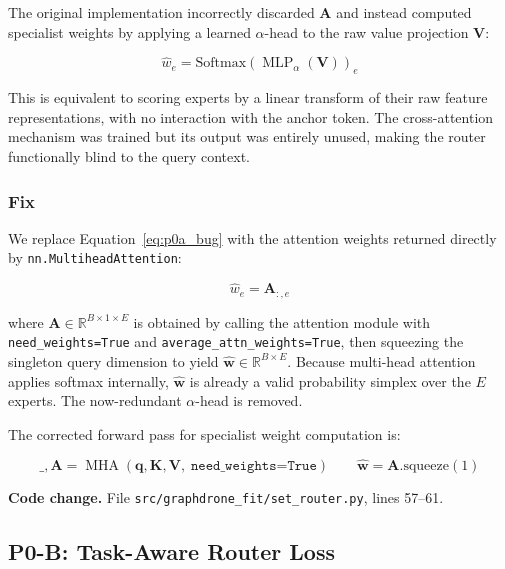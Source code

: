 The original implementation incorrectly discarded $\mathbf{A}$ and
instead computed specialist weights by applying a learned
$\alpha$-head to the raw value projection $\mathbf{V}$:

\begin{equation}
    \hat{w}_e = \text{Softmax}\!\left(
        \operatorname{MLP}_\alpha\!\left(\mathbf{V}\right)
    \right)_e
    \label{eq:p0a_bug}
\end{equation}

This is equivalent to scoring experts by a linear transform of their
raw feature representations, with no interaction with the anchor token.
The cross-attention mechanism was trained but its output was entirely
unused, making the router functionally blind to the query context.

\subsubsection{Fix}

We replace Equation~\ref{eq:p0a_bug} with the attention weights
returned directly by \texttt{nn.MultiheadAttention}:

\begin{equation}
    \hat{w}_e = \mathbf{A}_{:, e}
    \label{eq:p0a_fix}
\end{equation}

where $\mathbf{A} \in \mathbb{R}^{B \times 1 \times E}$ is obtained by
calling the attention module with \texttt{need\_weights=True} and
\texttt{average\_attn\_weights=True}, then squeezing the singleton
query dimension to yield $\hat{\mathbf{w}} \in \mathbb{R}^{B \times E}$.
Because multi-head attention applies softmax internally,
$\hat{\mathbf{w}}$ is already a valid probability simplex over the $E$
experts.
The now-redundant $\alpha$-head is removed.

The corrected forward pass for specialist weight computation is:

\begin{equation}
    \_, \mathbf{A} = \operatorname{MHA}(\mathbf{q}, \mathbf{K},
    \mathbf{V},\; \texttt{need\_weights=True})
    \qquad
    \hat{\mathbf{w}} = \mathbf{A}.\text{squeeze}(1)
    \label{eq:p0a_corrected}
\end{equation}

\noindent\textbf{Code change.}
File \texttt{src/graphdrone\_fit/set\_router.py}, lines 57--61.

\subsection{P0-B: Task-Aware Router Loss}
\label{sec:p0b}

